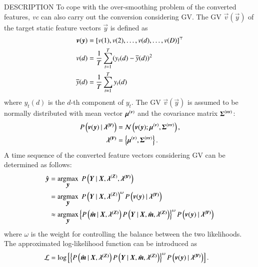 \begin{qsection}{DESCRIPTION}
To cope with the over-smoothing problem of the converted features, {\em vc} can also
carry out the conversion considering GV.  The GV $\vec{v}(\vec{y})$ of the target
static feature vectors $\vec{y}$ is defined as
\begin{align*}
 \vec{v}(\vec{y}) &= \left[v(1), v(2), \ldots, v(d), \ldots, v(D)\right]\trans \\
 v(d) &= \frac{1}{T} \Sum_{t=1}^{T} (y_{t}(d) - \overline{y}(d))^{2} \\
 \overline{y}(d) &= \frac{1}{T} \Sum_{t=1}^{T} y_{t}(d)
\end{align*}
where $y_{t}(d)$ is the $d$-th component of $y_{t}$.  The GV $\vec{v}(\vec{y})$ is
assumed to be normally distributed with mean vector $\vec{\mu}\dim{\sv}$ and the
covariance matrix $\vec{\Sigma}\dim{\sv\sv}$:
 \begin{align*}
  P\left(\vec{v}(\vec{y})\mid \vec{\lambda\dim{\vec{v}}}\right)
  &= \mathcal{N}\left(\vec{v}(\vec{y});
  \vec{\mu}\dim{\sv}, \vec{\Sigma}\dim{\sv\sv} \right), \\
  \vec{\lambda\dim{\vec{v}}} & =
  \left\{ \vec{\mu}\dim{\sv}, \vec{\Sigma}\dim{\sv\sv} \right\}.
 \end{align*}
 A time sequence of the converted feature vectors considering GV can be determined as
 follows:
 \begin{align*}
  \hat{\vec{y}} &= \argmax_{\vec{y}} \;P\left(\vec{Y}\mid \vec{X},
  \vec{\lambda}\dim{\sZ}, \vec{\lambda\dim{\vec{v}}} \right) \\
  & = \argmax_{\vec{y}} \;P\left(\vec{Y}\mid \vec{X},
  \vec{\lambda}\dim{\sZ} \right)^{\omega}
  P\left( \vec{v}(\vec{y}) \mid \vec{\lambda\dim{\vec{v}}} \right) \\
  &\approx \argmax_{\vec{y}}
  \left\{P\left(\hat{\vec{m}}\mid \vec{X}, \vec{\lambda\dim{\sZ}} \right)
  P\left(\vec{Y} \mid \vec{X}, \hat{\vec{m}}, \vec{\lambda\dim{\sZ}}\right)
  \right\}^{\omega}
  P\left( \vec{v}(\vec{y}) \mid \vec{\lambda\dim{\vec{v}}} \right)
 \end{align*}
 where $\omega$ is the weight for controlling the balance between the two
 likelihoods.  The approximated log-likelihood function can be introduced as
 \begin{align*}
  \mathcal{L} &= \log \left[
  \left\{ P\left(\hat{\vec{m}}\mid \vec{X}, \vec{\lambda\dim{\sZ}} \right)
  P\left(\vec{Y} \mid \vec{X}, \hat{\vec{m}}, \vec{\lambda\dim{\sZ}}\right)
  \right\}^{\omega}
  P\left( \vec{v}(\vec{y}) \mid \vec{\lambda\dim{\vec{v}}} \right)\right].
 \end{align*}

\end{qsection}
